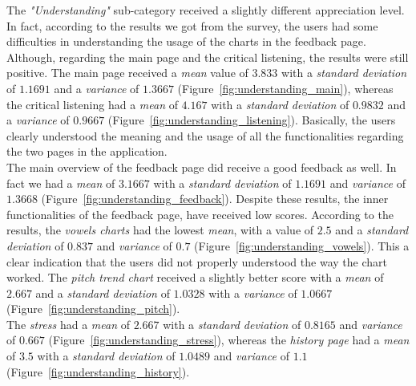 \noindent The \textit{"Understanding"} sub-category received a slightly different appreciation level. In fact, according to the results we got from the survey, the users had some difficulties in understanding the usage of the charts in the feedback page. Although, regarding the main page and the critical listening, the results were still positive. The main page received a \textit{mean} value of $3.833$ with a \textit{standard deviation} of $1.1691$ and a \textit{variance} of $1.3667$ (Figure~\ref{fig:understanding_main}), whereas the critical listening had a \textit{mean} of $4.167$ with a \textit{standard deviation} of $0.9832$ and a \textit{variance} of $0.9667$ (Figure~\ref{fig:understanding_listening}). Basically, the users clearly understood the meaning and the usage of all the functionalities regarding the two pages in the application. \\
\noindent The main overview of the feedback page did receive a good feedback as well. In fact we had a \textit{mean} of $3.1667$ with a \textit{standard deviation} of $1.1691$ and \textit{variance} of $1.3668$ (Figure~\ref{fig:understanding_feedback}). Despite these results, the inner functionalities of the feedback page, have received low scores. According to the results, the \textit{vowels charts} had the lowest \textit{mean}, with a value of $2.5$ and a \textit{standard deviation} of $0.837$ and \textit{variance} of $0.7$ (Figure~\ref{fig:understanding_vowels}). This a clear indication that the users did not properly understood the way the chart worked. The \textit{pitch trend chart} received a slightly better score with a \textit{mean} of $2.667$ and a \textit{standard deviation} of $1.0328$ with a \textit{variance} of $1.0667$ (Figure~\ref{fig:understanding_pitch}). \\
\noindent The \textit{stress} had a \textit{mean} of $2.667$ with a \textit{standard deviation} of $0.8165$ and \textit{variance} of $0.667$ (Figure~\ref{fig:understanding_stress}), whereas the \textit{history page} had a \textit{mean} of $3.5$ with a \textit{standard deviation} of $1.0489$ and \textit{variance} of $1.1$ (Figure~\ref{fig:understanding_history}).


